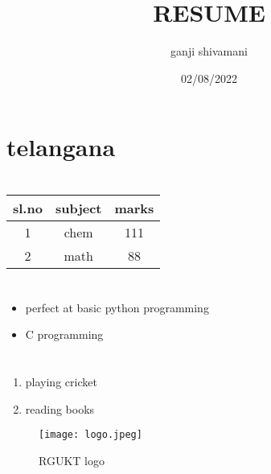 \documentclass{article}
\title{RESUME}
\author{ganji shivamani}
\date{02/08/2022}
\begin{document}
\maketitle

\section{
\color{blue}{NAME:}
\color{red}{SHIVAMANI}}
\section{\color{blue}{Address:}
telangana}
\section{\color{blue}{marks}}
\begin{center}

\begin{tabular}{|c|c|c|}
\hline
sl.no&subject&marks\\
\hline
1&chem&111\\
\hline
2&math&88\\
\hline
\end{tabular}
\end{center}
\section{}
\begin{itemize}
\item perfect at basic python programming
\item C programming
\end{itemize}
\section{\color{blue}{Hobbies}}
\begin{enumerate}
\item playing cricket
\item reading books
\end{enumerate}
\begin{figure}
\centering
\texttt{[image: logo.jpeg]}
\caption{RGUKT logo}
\end{figure}
\end{document}
